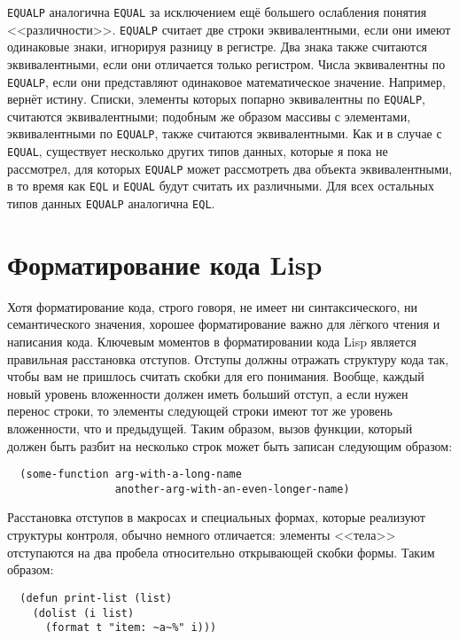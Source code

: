 \lstinline{EQUALP} аналогична \lstinline{EQUAL} за исключением ещё большего ослабления понятия
<<различности>>. \lstinline{EQUALP} считает две строки эквивалентными, если они имеют
одинаковые знаки, игнорируя разницу в регистре. Два знака также считаются эквивалентными,
если они отличается только регистром. Числа эквивалентны по \lstinline{EQUALP}, если они
представляют одинаковое математическое значение. Например,  вернёт
истину. Списки, элементы которых попарно эквивалентны по \lstinline{EQUALP}, считаются
эквивалентными; подобным же образом массивы с элементами, эквивалентными по
\lstinline{EQUALP}, также считаются эквивалентными. Как и в случае с \lstinline{EQUAL},
существует несколько других типов данных, которые я пока не рассмотрел, для которых
\lstinline{EQUALP} может рассмотреть два объекта эквивалентными, в то время как \lstinline{EQL}
и \lstinline{EQUAL} будут считать их различными. Для всех остальных типов данных
\lstinline{EQUALP} аналогична \lstinline{EQL}.

\section{Форматирование кода Lisp}

Хотя форматирование кода, строго говоря, не имеет ни синтаксического, ни семантического
значения, хорошее форматирование важно для лёгкого чтения и написания кода. Ключевым
моментов в форматировании кода Lisp является правильная расстановка отступов. Отступы
должны отражать структуру кода так, чтобы вам не пришлось считать скобки для его
понимания. Вообще, каждый новый уровень вложенности должен иметь больший отступ, а если
нужен перенос строки, то элементы следующей строки имеют тот же уровень вложенности, что и
предыдущей. Таким образом, вызов функции, который должен быть разбит на несколько строк
может быть записан следующим образом:

\begin{lstlisting}
  (some-function arg-with-a-long-name
                 another-arg-with-an-even-longer-name)
\end{lstlisting}

Расстановка отступов в макросах и специальных формах, которые реализуют структуры
контроля, обычно немного отличается: элементы <<тела>> отступаются на два пробела
относительно открывающей скобки формы. Таким образом:

\begin{lstlisting}
  (defun print-list (list)
    (dolist (i list)
      (format t "item: ~a~%" i)))
\end{lstlisting}

